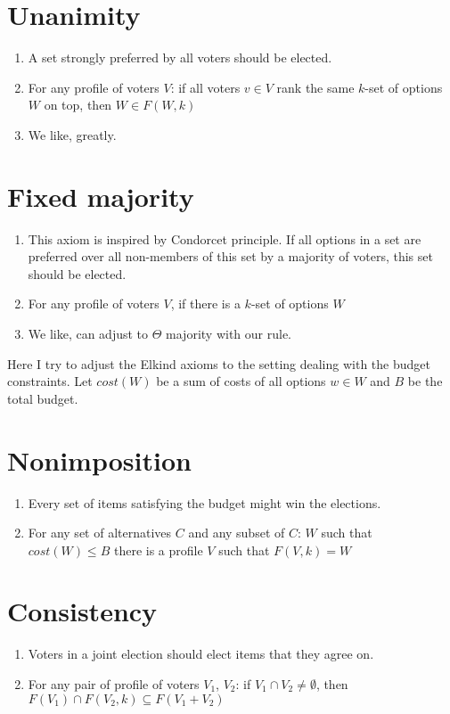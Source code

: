 \documentclass{article}
\begin{document}
\section{Unanimity}
\begin{enumerate}
\item A set strongly preferred by all voters should be elected.
\item For any profile of voters $V$: if all voters $v \in V$ rank the same $k$-set of options $W$ on top, then $W \in F(W, k)$
\item We like, greatly.
\end{enumerate}

\section{Fixed majority}
\begin{enumerate}
\item This axiom is inspired by Condorcet principle. If all options in a set are preferred over all non-members of this set by a majority of voters, this set should be elected.
\item For any profile of voters $V$, if there is a $k$-set of options $W$
\item We like, can adjust to $\Theta$ majority with our rule.
\end{enumerate}

Here I try to adjust the Elkind axioms to the setting dealing with the budget constraints. Let $cost(W)$ be a sum of costs of all options $w \in W$ and $B$ be the total budget.
\section{Nonimposition}
\begin{enumerate}
\item Every set of items satisfying the budget might win the elections.
\item For any set of alternatives $C$ and any subset of $C$: $W$ such that $cost(W) \leq B$ there is a profile $V$ such that $F(V, k)=W$
\end{enumerate}

\section{Consistency}
\begin{enumerate}
\item Voters in a joint election should elect items that they agree on.
\item For any pair of profile of voters $V_1$, $V_2$: if $V_1 \cap V_2 \neq \emptyset$, then $ F(V_1) \cap F(V_2, k) \subseteq F(V_1+V_2)$
\end{enumerate}
\end{document}
